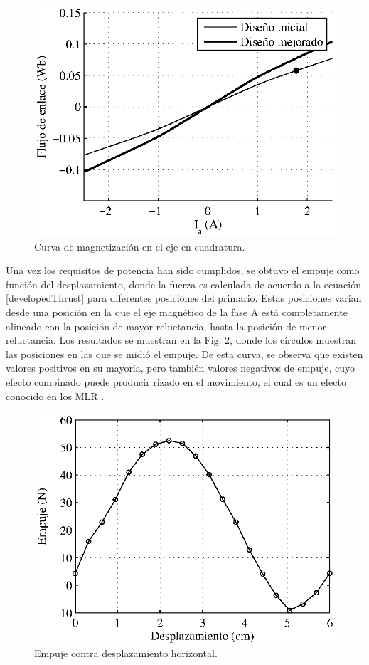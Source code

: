 \begin{figure}[hbtp]
\centering
\includegraphics[scale=1]{../img/Desarrollo_de_un_diseno_inicial/qaxismagnetization2.eps}
\caption{Curva de magnetización en el eje en cuadratura.}
\label{fig:qaxismagnetization2}
\end{figure}

Una vez los requisitos de potencia han sido cumplidos, se obtuvo el empuje como función del desplazamiento, donde la fuerza es calculada de acuerdo a la ecuación \ref{developedThrust} para diferentes posiciones del primario. Estas posiciones varían desde una posición en la que el eje magnético de la fase A está completamente alineado con la posición de mayor reluctancia, hasta la posición de menor reluctancia. Los resultados se muestran en la Fig. \ref{fig:fxdata}, donde los círculos muestran las posiciones en las que se midió el empuje. De esta curva, se observa que existen valores positivos en su mayoría, pero también valores negativos de empuje, cuyo efecto combinado puede producir rizado en el movimiento, el cual es un efecto conocido en los MLR \cite{stumberger2001,yuya2007}.

\begin{figure}[hbtp]
\centering
\includegraphics[scale=1]{../img/Desarrollo_de_un_diseno_inicial/fxdata.eps}
\caption{Empuje contra desplazamiento horizontal.}
\label{fig:fxdata}
\end{figure}


